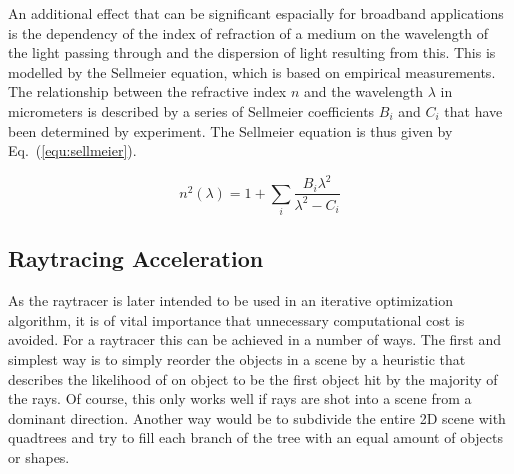 \documentclass[a4paper,10pt]{article}
\newcommand{\equref}[1]{Eq.~(\ref{#1})}
\begin{document}
    An additional effect that can be significant espacially for broadband
    applications is the dependency of the index of refraction of a medium
    on the wavelength of the light passing through and the dispersion
    of light resulting from this.
    This is modelled by the Sellmeier equation, which is based on 
    empirical measurements.
    The relationship between the refractive index $n$ and the wavelength 
    $\lambda$ in micrometers is described by a series of Sellmeier coefficients $B_i$ and
    $C_i$ that have been determined by experiment.
    The Sellmeier equation is thus given by \equref{equ:sellmeier}.

    \begin{equation}
        \label{equ:sellmeier}
        n^2(\lambda) = 1 + \sum_i \frac{B_i \lambda^2}{\lambda^2 - C_i}
    \end{equation}

    \subsection{Raytracing Acceleration} \label{sec:raytracing_acceleration}

    As the raytracer is later intended to be used in an iterative optimization
    algorithm, it is of vital importance that unnecessary computational cost 
    is avoided.
    For a raytracer this can be achieved in a number of ways.
    The first and simplest way is to simply reorder the objects in a scene
    by a heuristic that describes the likelihood of on object to be the
    first object hit by the majority of the rays.
    Of course, this only works well if rays are shot into a scene from
    a dominant direction.
    Another way would be to subdivide the entire 2D scene with quadtrees
    and try to fill each branch of the tree with an equal amount of 
    objects or shapes.
    
\end{document}
